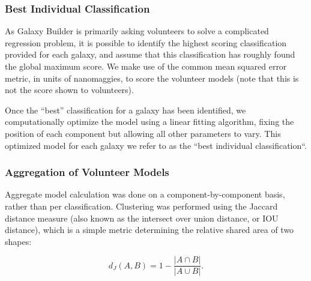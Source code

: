 \documentclass[../main.tex]{subfiles}
\begin{document}
\subsubsection{Best Individual Classification}

As Galaxy Builder is primarily asking volunteers to solve a complicated regression problem, it is possible to identify the highest scoring classification provided for each galaxy, and assume that this classification has roughly found the global maximum score. We make use of the common mean squared error metric, in units of nanomaggies, to score the volunteer models (note that this is not the score shown to volunteers).

Once the ``best'' classification for a galaxy has been identified, we computationally optimize the model using a linear fitting algorithm, fixing the position of each component but allowing all other parameters to vary. This optimized model for each galaxy we refer to as the ``best individual classification``.

\subsubsection{Aggregation of Volunteer Models}
\label{sec:aggregation_of_volunteer_models}



Aggregate model calculation was done on a component-by-component basis, rather than per classification. Clustering was performed using the Jaccard distance measure (also known as the intersect over union distance, or IOU distance), which is a simple metric determining the relative shared area of two shapes:

\begin{equation}
d_J(A, B) = 1 - \frac{|A \cap B|}{|A \cup B|}.
\end{equation}
\end{document}
